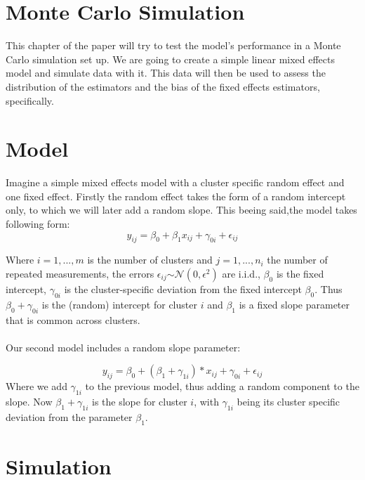 \documentclass[a4paper,11pt]{article}
\begin{document}
\section{Monte Carlo Simulation}

 	This chapter of the paper will try to test the model's performance in a Monte Carlo simulation set up. We are going to create a simple linear mixed effects model and simulate data with it. This data will then be used to assess the distribution of the estimators and the bias of the fixed effects estimators, specifically.    
 	
 	\section{Model}
 	Imagine a simple mixed effects model with a cluster specific random effect and one fixed effect. Firstly the random effect takes the form of a random intercept only, to which we will later add a random slope. This beeing said,the model takes following form:
 		\begin{equation}\label{eq:model1}
 	y_{ij}=\beta_0+\beta_1x_{ij}+\gamma_{0i}+\epsilon_{ij}
 	\end{equation}
  		
 	Where $i=1,...,m$ is the number of clusters and $j=1,...,n_i$ the number of repeated measurements, the errors $\epsilon_{ij}$$\sim\mathcal{N}(0,\epsilon^2)$ are i.i.d., $\beta_0$ is the fixed intercept, $\gamma_{0i}$ is the cluster-specific deviation from the fixed intercept $\beta_0$.
 	Thus $\beta_0+\gamma_{0i}$ is the (random) intercept for cluster $i$ and $\beta_1$ is a fixed slope parameter that is common across clusters.
 	\\
 	\\
 	Our second model includes a random slope parameter:
 	 	
 		\begin{equation}\label{eq:model2}
 	y_{ij}=\beta_0+(\beta_1+\gamma_{1i})*x_{ij}+\gamma_{0i}+\epsilon_{ij}
 	\end{equation}
 	Where we add $\gamma_{1i}$ to the previous model, thus adding a random component to the slope. Now $\beta_1+\gamma_{1i}$ is the slope for cluster $i$, with $\gamma_{1i}$ being its cluster specific deviation from the parameter $\beta_1$. 
 	
 
 	
	\section{Simulation}
\end{document}
